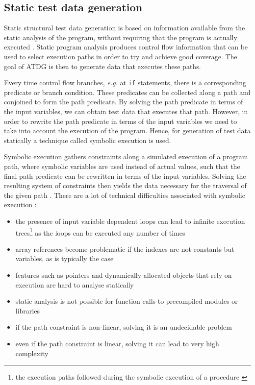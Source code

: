 \documentclass[a4paper,11pt,titlepage]{report}
\begin{document}
\subsection{Static test data generation}
Static structural test data generation is based on information available from the static analysis of the program, without requiring that the program is actually executed \cite{mcminn2004search}. Static program analysis produces control flow information that can be used to select execution paths in order to try and achieve good coverage. The goal of ATDG is then to generate data that executes these paths.

Every time control flow branches, \emph{e.g.} at \texttt{if} statements, there is a corresponding predicate or branch condition. These predicates can be collected along a path and conjoined to form the path predicate. By solving the path predicate in terms of the input variables, we can obtain test data that executes that path. However, in order to rewrite the path predicate in terms of the input variables we need to take into account the execution of the program. Hence, for generation of test data statically a technique called symbolic execution \cite{king1976symbolic} is used.

Symbolic execution gathers constraints along a simulated execution of a program path, where symbolic variables are used instead of actual values, such that the final path predicate can be rewritten in terms of the input variables. Solving the resulting system of constraints then yields the data necessary for the traversal of the given path \cite{king1975new, king1976symbolic}. There are a lot of technical difficulties associated with symbolic execution \cite{edvardsson1999survey,meudec2001atgen,mcminn2004search}:

\renewcommand{\labelitemi}{\tiny$\blacksquare$}

\begin{itemize}
	\item the presence of input variable dependent loops can lead to infinite execution trees\footnote{the execution paths followed during the symbolic execution of a procedure \cite{king1976symbolic}} as the loops can be executed any number of times
	\item array references become problematic if the indexes are not constants but variables, as is typically the case
	\item features such as pointers and dynamically-allocated objects that rely on execution are hard to analyse statically
	\item static analysis is not possible for function calls to precompiled modules or libraries
	\item if the path constraint is non-linear, solving it is an undecidable problem
	\item even if the path constraint is linear, solving it can lead to very high complexity
\end{itemize}
\end{document}
